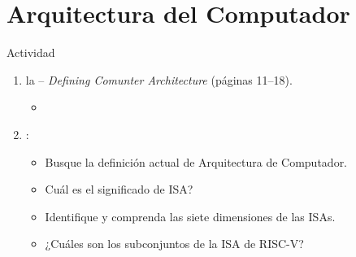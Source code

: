 \section{Arquitectura del Computador}

\begin{frame}[t]{Actividad}
\begin{enumerate}
  \item {} la  -- 
        \emph{Defining Comunter Architecture} (páginas 11--18).
    \begin{itemize}
      \item \credithennessy
    \end{itemize}

  \item {}:
    \begin{itemize}
      \item Busque la definición actual de Arquitectura de Computador.
      \item Cuál es el significado de ISA?
      \item Identifique y comprenda las siete dimensiones de las ISAs.
      \item ¿Cuáles son los subconjuntos de la ISA de RISC-V?
    \end{itemize}
\end{enumerate}
\end{frame}
